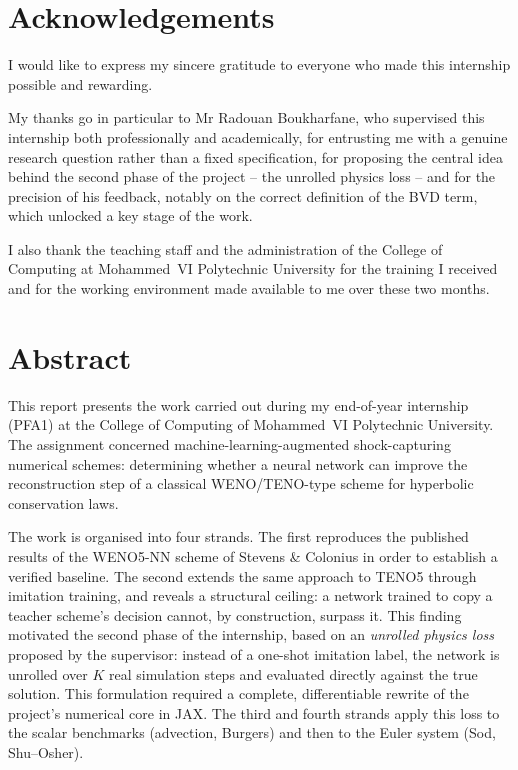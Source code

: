 \documentclass[12pt,a4paper,oneside]{report}
\begin{document}
\setcounter{page}{1}
\pagestyle{plain}

\chapter*{Acknowledgements}

I would like to express my sincere gratitude to everyone who made this
internship possible and rewarding.

My thanks go in particular to Mr Radouan Boukharfane, who supervised this
internship both professionally and academically, for entrusting me with a
genuine research question rather than a fixed specification, for proposing the
central idea behind the second phase of the project -- the unrolled physics
loss -- and for the precision of his feedback, notably on the correct
definition of the BVD term, which unlocked a key stage of the work.

I also thank the teaching staff and the administration of the College of
Computing at Mohammed~VI Polytechnic University for the training I received and
for the working environment made available to me over these two months.

\chapter*{Abstract}

This report presents the work carried out during my end-of-year internship
(PFA1) at the College of Computing of Mohammed~VI Polytechnic University. The
assignment concerned machine-learning-augmented shock-capturing numerical
schemes: determining whether a neural network can improve the reconstruction
step of a classical WENO/TENO-type scheme for hyperbolic conservation laws.

The work is organised into four strands. The first reproduces the published
results of the WENO5-NN scheme of Stevens \& Colonius in order to establish a
verified baseline. The second extends the same approach to TENO5 through
imitation training, and reveals a structural ceiling: a network trained to copy
a teacher scheme's decision cannot, by construction, surpass it. This finding
motivated the second phase of the internship, based on an \emph{unrolled
physics loss} proposed by the supervisor: instead of a one-shot imitation
label, the network is unrolled over $K$ real simulation steps and evaluated
directly against the true solution. This formulation required a complete,
differentiable rewrite of the project's numerical core in JAX. The third and
fourth strands apply this loss to the scalar benchmarks (advection, Burgers)
and then to the Euler system (Sod, Shu--Osher).
\end{document}
